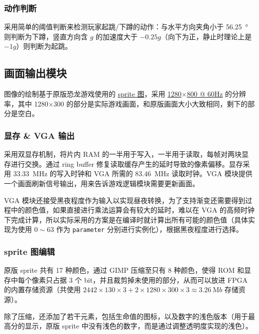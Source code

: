 \documentclass[UTF8, 11pt, fontset=none]{ctexart}
\begin{document}
\subsubsection{动作判断}

采用简单的阈值判断来检测玩家起跳/下蹲的动作：与水平方向夹角小于 \SI{56.25}{\degree} 则判断为下蹲，竖直方向含 $g$ 的加速度大于 $-0.25 g$（向下为正，静止时理论上是 $-1g$）则判断为起跳。

\subsection{画面输出模块}

图像的绘制基于原版恐龙游戏使用的 \href{https://github.com/chromium/chromium/blob/3b31f1cbd28e0a1199defe6f6b37001cef4c4790/components/neterror/resources/images/default_200_percent/offline/200-offline-sprite.png}{sprite 图}，采用 \href{http://tinyvga.com/vga-timing/1280x800@60Hz}{1280$\times$800 @ 60Hz} 的分辨率，其中 1280$\times$300 的部分是实际游戏画面，和原版画面大小大致相同，剩下的部分是空白。

\subsubsection{显存 \& VGA 输出}

采用双显存机制，将片内 RAM 的一半用于写入，一半用于读取，每帧对两块显存进行交换。通过 ring buffer 修复读取缓存产生的延时导致的像素偏移。显存采用 \SI{33.33}{\mega\hertz} 的写入时钟和 VGA 所需的 \SI{83.46}{\mega\hertz} 读取时钟。VGA 模块提供一个画面刷新信号输出，用来告诉游戏逻辑模块需要更新画面。

VGA 模块还接受黑夜程度作为输入以实现昼夜转换，为了支持渐变还需要得到过程中的颜色值，如果直接进行乘法运算会有较大的延时，难以在 VGA 的高频时钟下完成计算，所以实际采用的方案是在编译时就计算出所有可能的颜色值（具体实现为使用 $0 \sim 63$ 作为 \texttt{parameter} 分别进行实例化），根据黑夜程度进行选择。

\subsubsection{sprite 图编辑}

原版 sprite 共有 17 种颜色，通过 GIMP 压缩至只有 8 种颜色，使得 ROM 和显存中每个像素只占据 3 个 bit，并且裁剪掉未使用的部分，从而可以放进 FPGA 的内置存储资源（共使用 $2442 \times 130 \times 3 + 2 \times 1280 \times 300 \times 3 \approx \SI{3.26}{\mega b}$ 存储资源）。

除了压缩，还添加了若干元素，包括生命值的图标，以及数字的浅色版本（用于最高分的显示，原版 sprite 中没有浅色的数字，而是通过调整透明度实现的浅色）。
\end{document}
